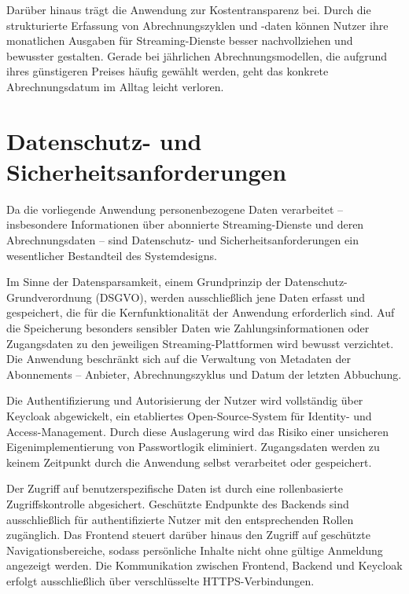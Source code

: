 Darüber hinaus trägt die Anwendung zur Kostentransparenz bei. Durch die
strukturierte Erfassung von Abrechnungszyklen und -daten können Nutzer
ihre monatlichen Ausgaben für Streaming-Dienste besser nachvollziehen
und bewusster gestalten. Gerade bei jährlichen Abrechnungsmodellen, die
aufgrund ihres günstigeren Preises häufig gewählt werden, geht das
konkrete Abrechnungsdatum im Alltag leicht verloren.


\section{Datenschutz- und Sicherheitsanforderungen}

Da die vorliegende Anwendung personenbezogene Daten verarbeitet --
insbesondere Informationen über abonnierte Streaming-Dienste und deren
Abrechnungsdaten -- sind Datenschutz- und Sicherheitsanforderungen ein
wesentlicher Bestandteil des Systemdesigns.

Im Sinne der Datensparsamkeit, einem Grundprinzip der Datenschutz-Grundverordnung
(DSGVO), werden ausschließlich jene Daten erfasst und gespeichert, die für
die Kernfunktionalität der Anwendung erforderlich sind. Auf die Speicherung
besonders sensibler Daten wie Zahlungsinformationen oder Zugangsdaten zu
den jeweiligen Streaming-Plattformen wird bewusst verzichtet. Die Anwendung
beschränkt sich auf die Verwaltung von Metadaten der Abonnements --
Anbieter, Abrechnungszyklus und Datum der letzten Abbuchung.

Die Authentifizierung und Autorisierung der Nutzer wird vollständig über
Keycloak abgewickelt, ein etabliertes Open-Source-System für
Identity- und Access-Management. Durch diese Auslagerung wird das Risiko
einer unsicheren Eigenimplementierung von Passwortlogik eliminiert.
Zugangsdaten werden zu keinem Zeitpunkt durch die Anwendung selbst
verarbeitet oder gespeichert.

Der Zugriff auf benutzerspezifische Daten ist durch eine
rollenbasierte Zugriffskontrolle abgesichert. Geschützte Endpunkte des
Backends sind ausschließlich für authentifizierte Nutzer mit den
entsprechenden Rollen zugänglich. Das Frontend steuert darüber hinaus
den Zugriff auf geschützte Navigationsbereiche, sodass persönliche
Inhalte nicht ohne gültige Anmeldung angezeigt werden. Die Kommunikation
zwischen Frontend, Backend und Keycloak erfolgt ausschließlich über
verschlüsselte HTTPS-Verbindungen.